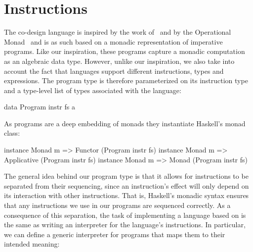\documentclass[../paper.tex]{subfiles}
\begin{document}



\section{Instructions}
\label{instr}

The co-design language is inspired by the work of~\cite{BjornBenny} and by the Operational Monad~\cite{Operational} and is as such based on a monadic representation of imperative programs. Like our inspiration, these programs capture a monadic computation as an algebraic data type. However, unlike our inspiration, we also take into account the fact that languages support different instructions, types and expressions. The program type is therefore parameterized on its instruction type and a type-level list of types associated with the language:

\begin{code}
data Program instr fs a
\end{code}

\noindent As programs are a deep embedding of monads they instantiate Haskell's monad class:

\begin{code}
instance Monad m => Functor     (Program instr fs)
instance Monad m => Applicative (Program instr fs)
instance Monad m => Monad       (Program instr fs)
\end{code}

The general idea behind our program type is that it allows for instructions to be separated from their sequencing, since an instruction's effect will only depend on its interaction with other instructions. That is, Haskell's monadic syntax ensures that any instructions we use in our programs are sequenced correctly. As a consequence of this separation, the task of implementing a language based on  is the same as writing an interpreter for the language's instructions. In particular, we can define a generic interpreter for programs that maps them to their intended meaning:
\end{document}
